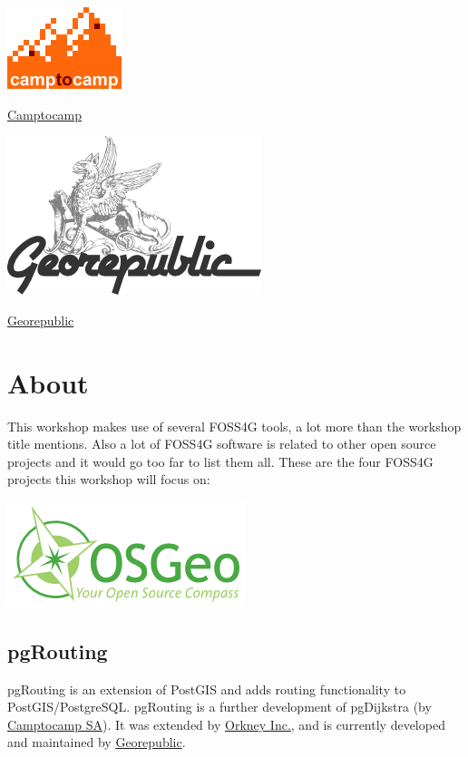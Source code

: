 \documentclass[a4paper,10pt,english]{manual}
\begin{document}
\includegraphics{camptocamp.png}

\href{http://www.camptocamp.com}{Camptocamp}

\includegraphics{georepublic.png}

\href{http://georepublic.de}{Georepublic}

\resetcurrentobjects
\hypertarget{--doc-chapters/about}{}

\chapter{About}

This workshop makes use of several FOSS4G tools, a lot more than the workshop title mentions. Also a lot of FOSS4G software is related to other open source projects and it would go too far to list them all. These are the four FOSS4G projects this workshop will focus on:

\includegraphics{osgeo.png}


\section{pgRouting}

pgRouting is an extension of PostGIS and adds routing functionality to PostGIS/PostgreSQL. pgRouting is a further development of pgDijkstra (by \href{http://www.camptocamp.com}{Camptocamp SA}). It was extended by \href{http://www.orkney.co.jp}{Orkney Inc.}, and is currently developed and maintained by \href{http://georepublic.de}{Georepublic}.
\end{document}
